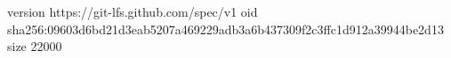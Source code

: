 version https://git-lfs.github.com/spec/v1
oid sha256:09603d6bd21d3eab5207a469229adb3a6b437309f2c3ffc1d912a39944be2d13
size 22000
